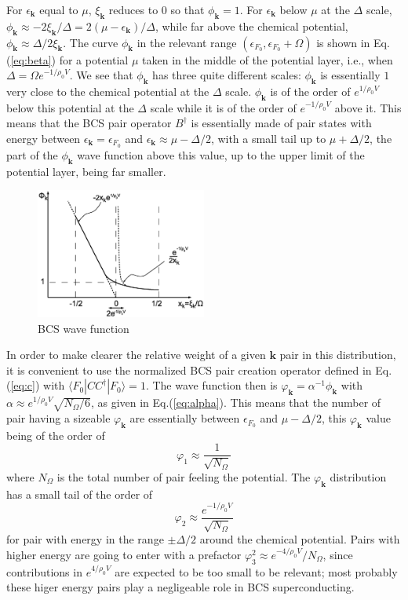 \documentclass[aps,prb,preprint,groupedaddress,amsmath]{revtex4-1}
\newcommand{\vk}{\ensuremath{\mathbf{k}}}
\newcommand{\dg}{\ensuremath{\dagger}}
\begin{document}
For $\epsilon_\vk$ equal to $\mu$, $\xi_\vk$ reduces to $0$ so that $\phi_\vk=1$.  For $\epsilon_\vk$ below $\mu$ at the $\Delta$ scale, $\phi_\vk\approx-2\xi_\vk/\Delta=2(\mu-\epsilon_\vk)/\Delta $, while far above the chemical potential, $\phi_\vk\approx\Delta/2\xi_\vk$. The curve $\phi_\vk$ in the relevant range $(\epsilon_{F_0},\epsilon_{F_0}+\Omega)$ is shown in Eq.(\ref{eq:beta}) for a potential $\mu$ taken in the middle of the potential layer, i.e., when $\Delta=\Omega{}e^{-1/\rho_0V}$.  We see that $\phi_\vk$ has three quite different scales: $\phi_\vk$ is essentially $1$ very close to the chemical potential at the $\Delta$ scale. $\phi_\vk$ is of the order of $e^{1/\rho_0V}$ below this potential at the $\Delta$ scale while it is of the order of $e^{-1/\rho_0V}$ above it.  This means that the BCS pair operator $B^\dg$ is essentially made of pair states with energy between $\epsilon_\vk=\epsilon_{F_0}$ and $\epsilon_\vk\approx\mu-\Delta/2$, with a small tail up to  $\mu+\Delta/2$, the part of the $\phi_\vk$ wave function above   this value, up to the upper limit of the potential layer, being far smaller. 
 \begin{figure}[htb]
 \includegraphics[width=0.5\textwidth]{BcsWF}
 \caption{BCS wave function\label{}}
 \end{figure}

In order to make clearer the relative weight of a given $\vk$ pair in this distribution, it is convenient to use the normalized BCS pair creation operator defined in Eq. (\ref{eq:c})
with $\langle{}F_0|CC^\dg|F_0\rangle=1$. The wave function then is $\varphi_\vk=\alpha^{-1}\phi_\vk$ with $\alpha\approx{}e^{1/\rho_0V}\sqrt{N_\Omega/6}$, as given in Eq.(\ref{eq:alpha}). This means that the number of pair having a sizeable $\varphi_\vk$ are essentially between $\epsilon_{F_0}$ and  $\mu-\Delta/2$, this $\varphi_\vk$ value being of the order of 
\begin{equation}
 \varphi_1\approx\frac{1}{\sqrt{N_\Omega}}
\end{equation}
where $N_\Omega$ is the total number of pair feeling the potential.  The $\varphi_\vk$ distribution has a small tail of the order of 
\begin{equation}
  \varphi_2\approx\frac{e^{-1/\rho_0V}}{\sqrt{N_\Omega}}
\end{equation}
for pair with energy in the range $\pm\Delta/2$ around the chemical potential.  Pairs with higher energy are going to enter with a prefactor $\varphi_3^2\approx{}e^{-4/\rho_0V}/N_\Omega$, since contributions in $e^{4/\rho_0V}$ are expected to be  too small to be relevant; most probably these higer energy pairs play a negligeable role in BCS superconducting. 
\end{document}
